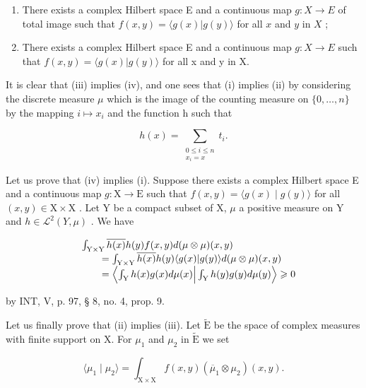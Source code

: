 \begin{enumerate}
\def\labelenumi{(\roman{enumi})}
\setcounter{enumi}{2}
\item
  There exists a complex Hilbert space E and a continuous map \(g \colon X \to E\) of total image such that \(f(x, y) = \langle g(x) | g(y) \rangle\) for all \(x\) and \(y\) in \(X\) ;
\item
  There exists a complex Hilbert space E and a continuous map \(g: X \to E\) such that \(f(x, y) = \langle g(x) | g(y) \rangle\) for all x and y in X.
\end{enumerate}

It is clear that (iii) implies (iv), and one sees that (i) implies (ii) by considering the discrete measure \(\mu\) which is the image of the counting measure on \(\{0,\ldots,n\}\) by the mapping \(i\mapsto x_{i}\) and the function h such that

\[
h(x) = \sum_{\substack{0\leqslant i\leqslant n\\ x_{i} = x}}t_{i}.
\]

Let us prove that (iv) implies (i). Suppose there exists a complex Hilbert space E and a continuous map \(g \colon \mathrm{X} \to \mathrm{E}\) such that \(f(x, y) = \langle g(x) \mid g(y) \rangle\) for all \((x, y) \in \mathrm{X} \times \mathrm{X}\) . Let Y be a compact subset of X, \(\mu\) a positive measure on Y and \(h \in \mathcal{L}^{2}(Y, \mu)\) . We have

\[
\begin{array}{r l} & {\int_ {\mathrm{Y} \times \mathrm{Y}} \overline {{h (x)}} h (y) f (x, y) d (\mu \otimes \mu) (x, y)} \\ & {\qquad = \int_ {\mathrm{Y} \times \mathrm{Y}} \overline {{h (x)}} h (y) \langle g (x) | g (y) \rangle d (\mu \otimes \mu) (x, y)} \\ & {\qquad = \left\langle \int_ {\mathrm{Y}} h (x) g (x) d \mu (x) \Big | \int_ {\mathrm{Y}} h (y) g (y) d \mu (y) \right\rangle \geqslant 0} \end{array}
\]

by INT, V, p. 97, § 8, no. 4, prop. 9.

Let us finally prove that (ii) implies (iii). Let \(\widetilde{\mathrm{E}}\) be the space of complex measures with finite support on X. For \(\mu_{1}\) and \(\mu_{2}\) in \(\widetilde{\mathrm{E}}\) we set

\[
\langle \mu_ {1} \mid \mu_ {2} \rangle = \int_ {\mathrm{X} \times \mathrm{X}} f (x, y) (\overline {{\mu}} _ {1} \otimes \mu_ {2}) (x, y).
\]

